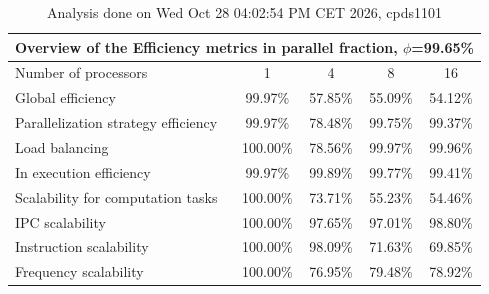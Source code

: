 \begin{table}[h]
\begin{center}
\begin{tabular}{|l|c|c|c|c|}
\hline
\multicolumn{5}{|c|}{Overview of the Efficiency metrics in parallel fraction, $\phi$=99.65\%} \\
\hline
\hline
Number of processors & 1 & 4 & 8 & 16 \\
\hline
\hline
Global efficiency                      &     99.97\% &     57.85\% &     55.09\% &     54.12\% \\
\hline
\hline
Parallelization strategy efficiency &     99.97\% &     78.48\% &     99.75\% &     99.37\% \\
\hline
Load balancing                   &    100.00\% &     78.56\% &     99.97\% &     99.96\% \\
In execution efficiency          &     99.97\% &     99.89\% &     99.77\% &     99.41\% \\
\hline
\hline
Scalability for computation tasks   &    100.00\% &     73.71\% &     55.23\% &     54.46\% \\
\hline
IPC scalability                  &    100.00\% &     97.65\% &     97.01\% &     98.80\% \\
Instruction scalability          &    100.00\% &     98.09\% &     71.63\% &     69.85\% \\
Frequency scalability            &    100.00\% &     76.95\% &     79.48\% &     78.92\% \\
\hline
\end{tabular}
\end{center}
\caption{ Analysis done on Wed Oct 28 04:02:54 PM CET 2026, cpds1101}
\end{table}
